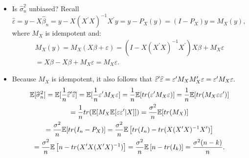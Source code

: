 \documentclass[notes=show]{beamer}
\begin{document}
\begin{frame}%

\begin{itemize}
\item Is $\widehat{\sigma }_{n}^{2}$ unbiased? Recall $\widehat{\varepsilon }%
=y-X\widehat{\beta }_{n}=y-X(X^{\prime }X)^{-1}X^{\prime
}y=y-P_{X}(y)=(I-P_{X})y=M_{X}(y),$ where $M_{X}$ is idempotent and:%
\begin{gather*}
M_{X}(y)=M_{X}(X\beta +\varepsilon )=(I-X(X^{\prime }X)^{-1}X^{\prime
})X\beta +M_{X}\varepsilon \\
=X\beta -X\beta +M_{X}\varepsilon =M_{X}\varepsilon .
\end{gather*}

\item Because $M_{X}$ is idempotent, it also follows that $\widehat{%
\varepsilon }^{\prime }\widehat{\varepsilon }=\varepsilon ^{\prime
}M_{X}M_{X}^{\prime }\varepsilon =\varepsilon ^{\prime }M_{X}\varepsilon .$ 
\begin{gather*}
\mathbb{E}[\widehat{\sigma }_{n}^{2}]=\mathbb{E}[\frac{1}{n}\widehat{%
\varepsilon }^{\prime }\widehat{\varepsilon }]=\mathbb{E}[\frac{1}{n}%
\varepsilon ^{\prime }M_{X}\varepsilon ]=\frac{1}{n}\mathbb{E}%
[tr(\varepsilon ^{\prime }M_{X}\varepsilon )]=\frac{1}{n}\mathbb{E}%
[tr(M_{X}\varepsilon \varepsilon ^{\prime })] \\
=\frac{1}{n}tr(\mathbb{E[}M_{X}\mathbb{E}[\varepsilon \varepsilon ^{\prime
}|X]])=\frac{\sigma ^{2}}{n}\mathbb{E[}tr(M_{X})] \\
=\frac{\sigma ^{2}}{n}\mathbb{E[}tr(I_{n}-P_{X})]=\frac{\sigma ^{2}}{n}%
\mathbb{E}\left[ tr(I_{n})-tr(X(X^{\prime }X)^{-1}X^{\prime })\right] \\
=\frac{\sigma ^{2}}{n}\mathbb{E}\left[ n-tr(X^{\prime }X(X^{\prime }X)^{-1})%
\right] =\frac{\sigma ^{2}}{n}\mathbb{E}\left[ n-tr(I_{k})\right] =\frac{%
\sigma ^{2}(n-k)}{n}\text{.}
\end{gather*}
\end{itemize}

\end{frame}%
\end{document}
